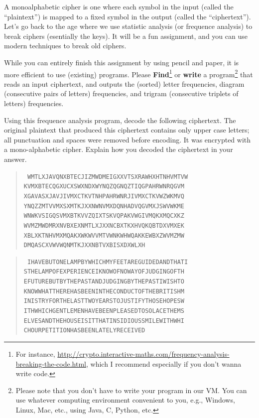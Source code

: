 \documentclass[11pt]{article}
\begin{document}
A monoalphabetic cipher is one where each symbol in the input (called the ``plaintext'') is mapped to a fixed symbol in the output (called the ``ciphertext''). Let's go back to the age where we use statistic analysis (or frequence analysis) to break ciphers (esentially the keys).  It will be a fun assignment, and you can use modern techniques to break old ciphers.

While you can entirely finish this assignment by using pencil and paper, it is more efficient to use (existing) programs. Please \textbf{Find}\footnote{For instance, \url{http://crypto.interactive-maths.com/frequency-analysis-breaking-the-code.html}, which I recommend especially if you don't wanna write code.} or \textbf{write} a program\footnote{Please note that you don't have to write your program in our VM. You can use whatever computing environment convenient to you, e.g., Windows, Linux, Mac, etc., using Java, C, Python, etc.} that reads an input ciphertext, and outputs the (sorted) letter frequencies, diagram (consecutive pairs of letters) frequencies, and trigram (consecutive triplets of letters) frequencies.

Using this frequence analysis program, decode the following ciphertext. The original plaintext that produced this ciphertext contains only upper case letters;  all punctuation and spaces were removed before encoding.  It was encrypted with a mono-alphabetic cipher.  Explain how you decoded the ciphertext in your answer.

\begin{quote}
\raggedright{
{\tt
WMTLXJAVQNXBTECJIZMWDMEIGXXVTSXRAWHXHTNHVMTVW
KVMXBTECQGXUCXSWXNDXWYNQZQGNQZTIQGPAHRWNRQGVM
XGAVASXJAVJIVMXCTKVTNHPAHRWNRJIVMXCTKVWZWKMVQ
YNQZZMTVVMXSXMTKJXXNWNVMXDQNHADVQGVMXJSWVWKME
WNWKVSIGQSVMXBTKVVZQIXTSKVQPAKVWGIVMQKXMQCXKZ
WVMZMWDMRXNVBXEXNMTLXJXXNCBXTKXHVQKQBTDXVMXEK
XBLXKTNHVMXMQAKXWKWVVMTVWNKWHWQAKKEWBXZWVMZMW
DMQASCXVWVWQNMTKJXXNBTVXBISXDXWLXH
}
}
\end{quote}

\begin{quote}
\raggedright{
{\tt
IHAVEBUTONELAMPBYWHICHMYFEETAREGUIDEDANDTHATI
STHELAMPOFEXPERIENCEIKNOWOFNOWAYOFJUDGINGOFTH
EFUTUREBUTBYTHEPASTANDJUDGINGBYTHEPASTIWISHTO
KNOWWHATTHEREHASBEENINTHECONDUCTOFTHEBRITISHM
INISTRYFORTHELASTTWOYEARSTOJUSTIFYTHOSEHOPESW
ITHWHICHGENTLEMENHAVEBEENPLEASEDTOSOLACETHEMS
ELVESANDTHEHOUSEISITTHATINSIDIOUSSMILEWITHWHI
CHOURPETITIONHASBEENLATELYRECEIVED
}
}
\end{quote}
\end{document}
